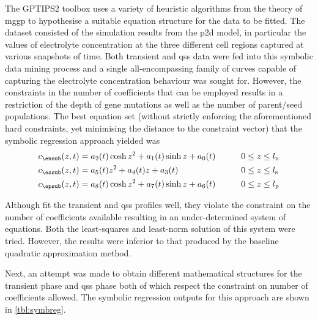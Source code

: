 The GPTIPS2  toolbox uses a variety  of heuristic algorithms from  the theory of
\gls{mggp}  to hypothesise  a suitable  equation structure  for the  data to  be
fitted.  The dataset  consisted of  the  simulation results  from the  \gls{p2d}
model,  in particular  the  values  of electrolyte  concentration  at the  three
different cell  regions captured  at various snapshots  of time.  Both transient
and  \gls{qss} data  were  fed into  this  symbolic data  mining  process and  a
single all-encompassing  family of curves  capable of capturing  the electrolyte
concentration behaviour was  sought for. However, the constraints  in the number
of coefficients that  can be employed results  in a restriction of  the depth of
gene  mutations as  well  as the  number of  parent/seed  populations. The  best
equation set  (without strictly  enforcing the aforementioned  hard constraints,
yet  minimising  the  distance  to  the constraint  vector)  that  the  symbolic
regression approach yielded was
\begin{alignat}{2}
    c_\ensub(z,t) & = a_2(t) \cosh z^2 + a_1(t) \sinh z + a_0(t) \qquad &  & 0 \le z \le l_\text{n} \label{eq:cnstrviolneg} \\
    c_\essub(z,t) & = a_5(t) z^2 + a_4(t) z + a_3(t) \qquad             &  & 0 \le z \le l_\text{s}                         \\
    c_\epsub(z,t) & = a_8(t) \cosh z^2 + a_7(t) \sinh z + a_6(t) \qquad &  & 0 \le z \le l_\text{p}\label{eq:cnstrviolpos}
\end{alignat}

Although   fit   the  transient  and
\gls{qss}  profiles  well,  they  violate   the  constraint  on  the  number  of
coefficients  available resulting  in  an under-determined  system of  equations.
Both  the least-squares  and  least-norm  solution of  this  system were  tried.
However, the  results were inferior to  that produced by the  baseline quadratic
approximation method.

Next, an  attempt was made to  obtain different mathematical structures  for the
transient phase  and \gls{qss}  phase both  of which  respect the  constraint on
number  of  coefficients  allowed.  The symbolic  regression  outputs  for  this
approach are shown in \cref{tbl:symbreg}.

